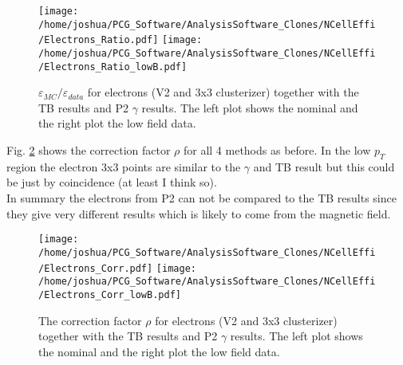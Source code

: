 \documentclass[ALICE]{ALICE_analysis_notes}
\begin{document}
\begin{figure}[h!]
	\centering
	\texttt{[image: /home/joshua/PCG\_Software/AnalysisSoftware\_Clones/NCellEffi/Electrons\_Ratio.pdf]}	
	\texttt{[image: /home/joshua/PCG\_Software/AnalysisSoftware\_Clones/NCellEffi/Electrons\_Ratio\_lowB.pdf]}
	
	\caption{  $\varepsilon_{MC}/\varepsilon_{data}$ for electrons (V2 and 3x3 clusterizer) together with the TB results and P2 $\gamma$ results. The left plot shows the nominal and the right plot the low field data.   }
	\label{fig:electrons_Ratio}
\end{figure}

Fig. \ref{fig:electrons_Corr} shows the correction factor $\rho$ for all 4 methods as before. In the low $p_{T}$ region the electron 3x3 points are similar to the $\gamma$ and TB result but this could be just by coincidence (at least I think so).\\
In summary the electrons from P2 can not be compared to the TB results since they give very different results which is likely to come from the magnetic field.
\begin{figure}[h!]
	\centering
	\texttt{[image: /home/joshua/PCG\_Software/AnalysisSoftware\_Clones/NCellEffi/Electrons\_Corr.pdf]}	
	\texttt{[image: /home/joshua/PCG\_Software/AnalysisSoftware\_Clones/NCellEffi/Electrons\_Corr\_lowB.pdf]}
	
	\caption{  The correction factor $\rho$ for electrons (V2 and 3x3 clusterizer) together with the TB results and P2 $\gamma$ results. The left plot shows the nominal and the right plot the low field data.   }
	\label{fig:electrons_Corr}
\end{figure}




\newpage
\end{document}
